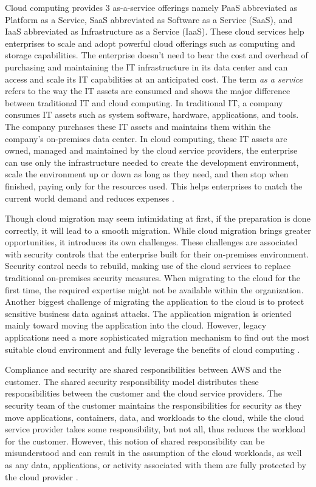 \par Cloud computing provides 3 as-a-service offerings
namely PaaS abbreviated as Platform as a Service,
SaaS abbreviated as Software
as a Service
(SaaS), and IaaS abbreviated as Infrastructure
as a
Service
(IaaS).
These cloud
services help enterprises to scale and adopt powerful cloud offerings such as computing and storage capabilities.
The enterprise doesn't need to bear the cost and overhead
of purchasing and maintaining the IT infrastructure in its
data center and can access and scale its IT capabilities at
an anticipated cost.
The term \textit{as a service} refers to the way the IT assets are consumed and shows the major difference between traditional IT and cloud computing.
In traditional IT, a company consumes IT assets such as system software, hardware, applications, and tools.
The company purchases these IT assets and maintains them within the company’s on-premises data center.
In cloud computing, these IT assets are owned, managed and maintained by the cloud service providers, the enterprise can use only the infrastructure needed to create the development environment, scale the environment up or down as long as they need, and then stop when finished, paying only for the resources used. This helps enterprises to match the current world demand and reduces expenses \cite{3}.

\par Though cloud migration may seem intimidating at
first, if the preparation is done correctly, it will lead to a smooth migration.
While cloud migration brings greater opportunities, it introduces its own challenges.
These challenges are associated with security controls that the enterprise built for their on-premises environment.
Security control needs to rebuild, making use of the cloud services to replace traditional on-premises security measures.
When migrating to the cloud for the first time, the required expertise might not be available within the organization.
Another biggest challenge of migrating the application to the cloud is to protect sensitive business data against attacks.
The application migration is oriented mainly toward moving the application into the cloud.
However, legacy applications need a more sophisticated migration mechanism to find out the most suitable cloud environment and fully leverage the benefits of cloud computing \cite{4}.

\par Compliance and security are shared responsibilities between AWS and the customer.
The shared security responsibility model distributes these
responsibilities between the customer and the cloud
service providers.
The security team of the customer maintains the
responsibilities for security as they move applications,
containers, data, and workloads to the cloud, while the cloud service provider takes some responsibility, but not all, thus reduces the workload for the customer.
However, this notion of shared responsibility can be misunderstood and can result in the assumption of the cloud
workloads, as well as any data, applications, or activity associated with them are fully protected by the cloud provider \cite{5}.



